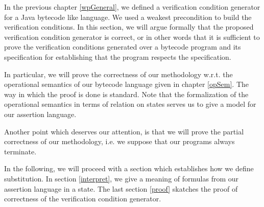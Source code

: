  In the previous chapter \ref{wpGeneral}, we defined a verification
 condition generator for a Java bytecode like language. We used a weakest precondition
 to build the verification conditions. In this section, we will argue formally that the
 proposed verification condition generator is correct, or in other words that it is sufficient
 to prove the verification conditions generated over a bytecode program and its specification 
 for establishing that the program respects the specification. 

 In particular, we will prove the correctness of our methodology w.r.t. the operational semantics of our bytecode language
 given in chapter \ref{opSem}. The way in which the proof is done is standard. Note that the formalization
 of the operational semantics in terms of relation on states serves us to give a model for our assertion
 language. 

 Another point which deserves our attention, is that we will prove the partial correctness of our methodology, i.e.
 we suppose that our programs always terminate.

 In the following, we will proceed with a section which establishes how we define substitution. 
 In section \ref{interpret}, we give a meaning of formulas from our assertion language in a state.
 The last section \ref{proof} skatches the proof of correctness of the verification condition generator.  


